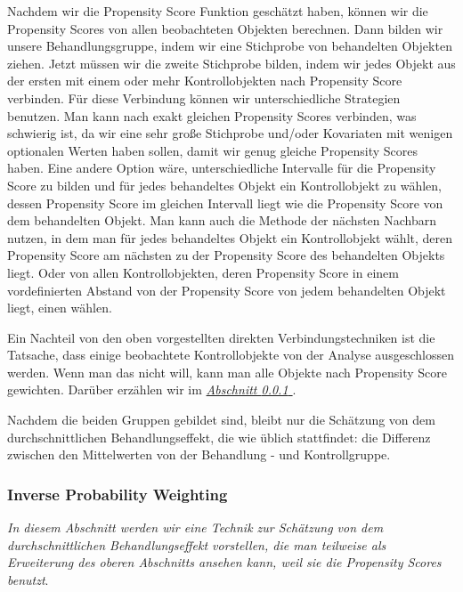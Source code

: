 \documentclass[12pt,a4paper,twoside]{scrartcl}
\numberwithin{equation}{section}
\newcommand{\refsec}[1]{\emph{\hyperref[#1]{Abschnitt \ref*{#1} }}}
\begin{document}
\noindent
Nachdem wir die Propensity Score Funktion geschätzt haben, können wir die Propensity Scores von allen beobachteten Objekten berechnen. Dann bilden wir unsere Behandlungsgruppe, indem wir eine Stichprobe von behandelten Objekten ziehen. Jetzt müssen wir die zweite Stichprobe bilden, indem wir jedes Objekt aus der ersten mit einem oder mehr Kontrollobjekten nach Propensity Score verbinden. Für diese Verbindung können wir unterschiedliche Strategien benutzen. Man kann nach exakt gleichen Propensity Scores verbinden, was schwierig ist, da wir eine sehr große Stichprobe und/oder Kovariaten mit wenigen optionalen Werten haben sollen, damit wir genug gleiche Propensity Scores haben. Eine andere Option wäre, unterschiedliche Intervalle für die Propensity Score zu bilden und für jedes behandeltes Objekt ein Kontrollobjekt zu wählen, dessen Propensity Score im gleichen Intervall liegt wie die Propensity Score von dem behandelten Objekt. Man kann auch die Methode der nächsten Nachbarn nutzen, in dem man für jedes behandeltes Objekt ein Kontrollobjekt wählt, deren Propensity Score am nächsten zu der Propensity Score des behandelten Objekts liegt. Oder von allen Kontrollobjekten, deren Propensity Score in einem vordefinierten Abstand von der Propensity Score von jedem behandelten Objekt liegt, einen wählen\cite{stuart2010matching}.\par 

\noindent
Ein Nachteil von den oben vorgestellten direkten Verbindungstechniken ist die Tatsache, dass einige beobachtete Kontrollobjekte von der Analyse ausgeschlossen werden. Wenn man das nicht will, kann man alle Objekte nach Propensity Score gewichten. Darüber erzählen wir im \refsec{subsubsec:inverseProbabilityWeighting}. \par

\noindent
Nachdem die beiden Gruppen gebildet sind, bleibt nur die Schätzung von dem durchschnittlichen Behandlungseffekt, die wie üblich stattfindet: die Differenz zwischen den Mittelwerten von der Behandlung - und Kontrollgruppe.
\par 
\subsubsection{Inverse Probability Weighting}\label{subsubsec:inverseProbabilityWeighting}

\noindent
\emph{In diesem Abschnitt werden wir eine Technik zur Schätzung von dem durchschnittlichen Behandlungseffekt vorstellen, die man teilweise als Erweiterung des oberen Abschnitts ansehen kann, weil sie die Propensity Scores benutzt}.
\par
\end{document}
